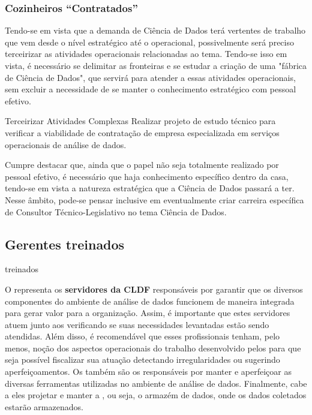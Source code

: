     \subsubsection*{Cozinheiros ``Contratados''}
    
    Tendo-se em vista que a demanda de Ciência de Dados terá vertentes de trabalho que vem desde o nível estratégico até o operacional, possivelmente será preciso terceirizar as atividades operacionais relacionadas ao tema. Tendo-se isso em vista, é necessário se delimitar as fronteiras e se estudar a criação de uma "fábrica de Ciência de Dados", que servirá para atender a essas atividades operacionais, sem excluir a necessidade de se manter o conhecimento estratégico com pessoal efetivo.
    
    \begin{env-proposta}{Terceirizar Atividades Complexas}
        \nohyphens{Realizar projeto de estudo técnico para verificar a viabilidade de contratação de empresa especializada em serviços operacionais de análise de dados.
        }
    \end{env-proposta}        
    
    Cumpre destacar que, ainda que o papel não seja totalmente realizado por pessoal efetivo, é necessário que haja conhecimento específico dentro da casa, tendo-se em vista a natureza estratégica que a Ciência de Dados passará a ter. Nesse âmbito, pode-se pensar inclusive em eventualmente criar carreira específica de Consultor Técnico-Legislativo no tema Ciência de Dados.
        

    \subsection{Gerentes treinados}

    \begin{env-cenario2}{}
            \mschecknao \xspace \GERENTES \xspace treinados
    \end{env-cenario2}    

    O  representa os \textbf{servidores da CLDF} responsáveis por garantir que os diversos componentes do ambiente de análise de dados funcionem de maneira integrada para gerar valor para a organização. Assim, é importante que estes servidores atuem junto aos \CLIENTES \xspace verificando se suas necessidades levantadas estão sendo atendidas. Além disso, é recomendável que esses profissionais tenham, pelo menos, noção dos aspectos operacionais do trabalho desenvolvido pelos \COZINHEIROS \xspace para que seja possível fiscalizar sua atuação detectando irregularidades ou sugerindo aperfeiçoamentos. Os \GERENTES \xspace também são os responsáveis por manter e aperfeiçoar as diversas ferramentas utilizadas no ambiente de análise de dados. Finalmente, cabe a eles projetar e manter a \DESPENSA, ou seja, o armazém de dados, onde os dados coletados estarão armazenados.  
    
